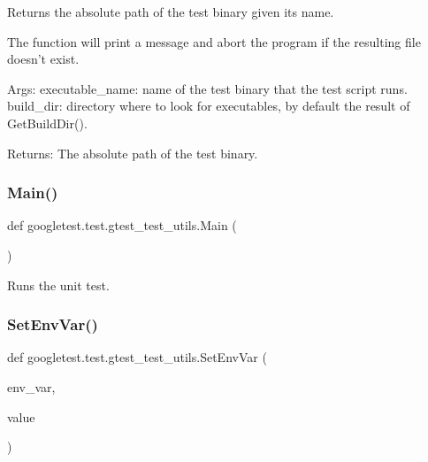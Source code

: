 \begin{DoxyVerb}Returns the absolute path of the test binary given its name.

The function will print a message and abort the program if the resulting file
doesn't exist.

Args:
  executable_name: name of the test binary that the test script runs.
  build_dir:       directory where to look for executables, by default
                   the result of GetBuildDir().

Returns:
  The absolute path of the test binary.
\end{DoxyVerb}
 \mbox{\label{namespacegoogletest_1_1test_1_1gtest__test__utils_a563b0985f0a2e8cbdff05aefd1cd2f66}} 
\subsubsection{\texorpdfstring{Main()}{Main()}}
{\footnotesize\ttfamily def googletest.\+test.\+gtest\+\_\+test\+\_\+utils.\+Main (\begin{DoxyParamCaption}{ }\end{DoxyParamCaption})}

\begin{DoxyVerb}Runs the unit test.\end{DoxyVerb}
 \mbox{\label{namespacegoogletest_1_1test_1_1gtest__test__utils_a8fcfee85e4aaa05daca8429e45b6d0ae}} 
\subsubsection{\texorpdfstring{SetEnvVar()}{SetEnvVar()}}
{\footnotesize\ttfamily def googletest.\+test.\+gtest\+\_\+test\+\_\+utils.\+Set\+Env\+Var (\begin{DoxyParamCaption}\item[{}]{env\+\_\+var,  }\item[{}]{value }\end{DoxyParamCaption})}

